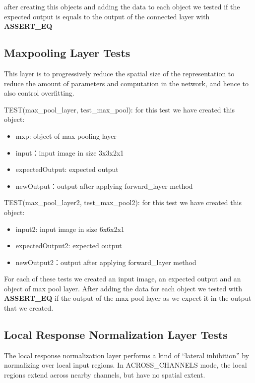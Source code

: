 \documentclass[parskip=full]{scrartcl}
\newcommand\tab[1][1cm]{\hspace*{#1}}
\begin{document}
   \tab after creating this objects and adding the data to each object we tested if the expected output is equals to the output of the connected layer with \textbf{ASSERT_EQ}

   \subsection{Maxpooling Layer Tests}
   \tab This layer is to progressively reduce the spatial size of the representation to reduce the amount of parameters and computation in the network, and hence to also control overfitting. 
   
   \tab TEST(max_pool_layer, test_max_pool):
   for this test we have created this object:
   
   \begin{itemize}
       \item mxp: object of max pooling layer
       \item input：input image in size 3x3x2x1
       \item expectedOutput: expected output 
       \item newOutput：output after applying forward_layer method
   \end{itemize}

   \tab TEST(max_pool_layer2, test_max_pool2):
   for this test we have created this object:
   
   \begin{itemize}
       \item input2: input image in size 6x6x2x1
       \item expectedOutput2: expected output 
       \item newOutput2：output after applying forward_layer method
   \end{itemize}
   

   \tab For each of these tests we created an input image, an expected output and an object of max pool layer. After adding the data for each object we tested with \textbf{ASSERT_EQ} if the output of the max pool layer as we expect it in the output that we created. 
   
   \subsection{Local Response Normalization Layer Tests}
   
   \tab The local response normalization layer performs a kind of “lateral inhibition” by normalizing over local input regions. In ACROSS_CHANNELS mode, the local regions extend across nearby channels, but have no spatial extent.
   
\end{document}
